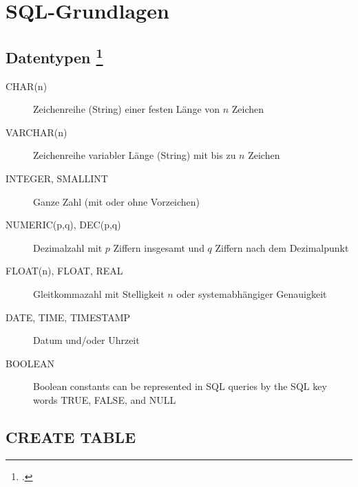 \documentclass{bschlangaul-haupt}
\begin{document}

\chapter{SQL-Grundlagen}

%

\section{Datentypen
\footcite[Seite 132]{winter}}

\begin{description}
\item[CHAR(n)]

Zeichenreihe (String) einer festen Länge von $n$ Zeichen

\item[VARCHAR(n)]

Zeichenreihe variabler Länge (String) mit bis zu $n$
Zeichen

\item[INTEGER, SMALLINT]

Ganze Zahl (mit oder ohne Vorzeichen)

\item[NUMERIC(p,q), DEC(p,q)]

Dezimalzahl mit $p$ Ziffern insgesamt und $q$
Ziffern nach dem Dezimalpunkt

\item[FLOAT(n), FLOAT, REAL]

Gleitkommazahl mit Stelligkeit $n$ oder systemabhängiger Genauigkeit

\item[DATE, TIME, TIMESTAMP]

Datum und/oder Uhrzeit

\item[BOOLEAN]

Boolean constants can be represented in SQL queries by the SQL key words
TRUE, FALSE, and NULL
\end{description}

\section{CREATE TABLE}
\end{document}
